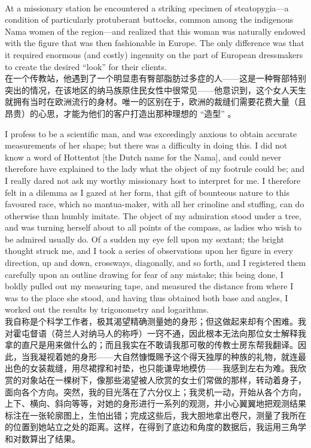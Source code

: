 \documentclass{article}
\begin{document}
\\
At a missionary station he encountered a striking specimen of steatopygia—a condition of particularly protuberant buttocks, common among the indigenous Nama women of the region—and realized that this woman was naturally endowed with the figure that was then fashionable in Europe. The only difference was that it required enormous (and costly) ingenuity on the part of European dressmakers to create the desired “look” for their clients.\\
在一个传教站，他遇到了一个明显患有臀部脂肪过多症的人——这是一种臀部特别突出的情况，在该地区的纳马族原住民女性中很常见——他意识到，这个女人天生就拥有当时在欧洲流行的身材。唯一的区别在于，欧洲的裁缝们需要花费大量（且昂贵）的心思，才能为他们的客户打造出那种理想的 “造型” 。\\

\addtolength{\leftskip}{1cm}

I profess to be a scientific man, and was exceedingly anxious to obtain accurate measurements of her shape; but there was a difficulty in doing this. I did not know a word of Hottentot [the Dutch name for the Nama], and could never therefore have explained to the lady what the object of my footrule could be; and I really dared not ask my worthy missionary host to interpret for me. I therefore felt in a dilemma as I gazed at her form, that gift of bounteous nature to this favoured race, which no mantua-maker, with all her crinoline and stuffing, can do otherwise than humbly imitate. The object of my admiration stood under a tree, and was turning herself about to all points of the compass, as ladies who wish to be admired usually do. Of a sudden my eye fell upon my sextant; the bright thought struck me, and I took a series of observations upon her figure in every direction, up and down, crossways, diagonally, and so forth, and I registered them carefully upon an outline drawing for fear of any mistake; this being done, I boldly pulled out my measuring tape, and measured the distance from where I was to the place she stood, and having thus obtained both base and angles, I worked out the results by trigonometry and logarithms.\\
我自称是个科学工作者，极其渴望精确测量她的身形；但这做起来却有个困难。我对霍屯督语（荷兰人对纳马人的称呼）一窍不通，因此根本无法向那位女士解释我拿的直尺是用来做什么的；而且我实在不敢请我那可敬的传教士房东帮我翻译。因此，当我凝视着她的身形——大自然慷慨赐予这个得天独厚的种族的礼物，就连最出色的女装裁缝，用尽裙撑和衬垫，也只能谦卑地模仿——我感到左右为难。我欣赏的对象站在一棵树下，像那些渴望被人欣赏的女士们常做的那样，转动着身子，面向各个方向。突然，我的目光落在了六分仪上；我灵机一动，开始从各个方向，上下、横向、斜向等等，对她的身形进行一系列的观测，并小心翼翼地把观测结果标注在一张轮廓图上，生怕出错；完成这些后，我大胆地拿出卷尺，测量了我所在的位置到她站立之处的距离。这样，在得到了底边和角度的数据后，我运用三角学和对数算出了结果。\\
\end{document}
